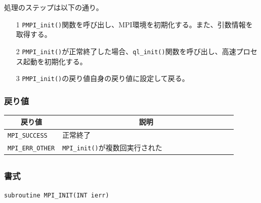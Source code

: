 \documentclass[twoside,11pt,fleqn]{book}
\begin{document}
処理のステップは以下の通り。
\begin{itemize}
\item[1]\texttt{PMPI\_init()}関数を呼び出し、MPI環境を初期化する。また、引数情報を取得する。
\item[2]\texttt{PMPI\_init()}が正常終了した場合、\texttt{ql\_init()}関数を呼び出し、高速プロセス起動を初期化する。
\item[3]\texttt{PMPI\_init()}の戻り値自身の戻り値に設定して戻る。
\end{itemize}

\subsubsection*{戻り値}{\quad}
\begin{table}[!ht]
\footnotesize
\begin{tabular}{|p{0.15\linewidth}|p{0.75\linewidth}|} \hline
\multicolumn{1}{|c}{\textbf{戻り値}}&\multicolumn{1}{|c|}{\textbf{説明}}\\ \hline \hline
\texttt{MPI\_SUCCESS}&正常終了\\ \hline
\texttt{MPI\_ERR\_OTHER}&\texttt{MPI\_init()}が複数回実行された\\ \hline
\end{tabular}
\vspace{-0em}
\end{table}
\FloatBarrier

\subsection{}
\subsubsection*{書式}{\quad} \texttt{subroutine MPI\_INIT(INT ierr)}
\end{document}
